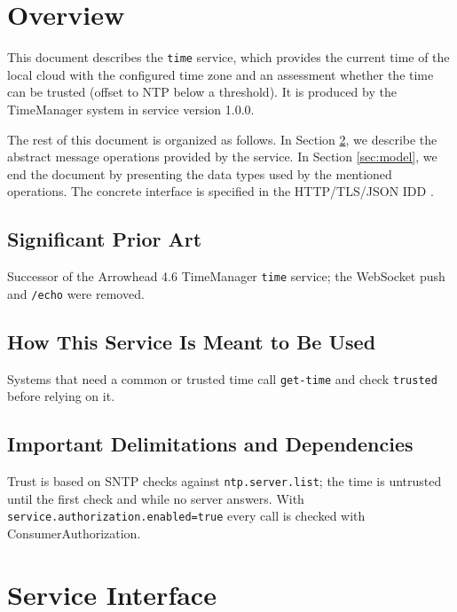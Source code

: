 \documentclass[a4paper]{arrowhead}
\begin{document}
\section{Overview}
\label{sec:overview}

This document describes the \texttt{time} service, which provides the current time of the local cloud with the configured time zone and an assessment whether the time can be trusted (offset to NTP below a threshold).
It is produced by the TimeManager system \cite{tim-sysd} in service version 1.0.0.

The rest of this document is organized as follows.
In Section \ref{sec:operations}, we describe the abstract message operations provided by the service.
In Section \ref{sec:model}, we end the document by presenting the data types used by the mentioned operations.
The concrete interface is specified in the HTTP/TLS/JSON IDD \cite{tim-time-http-idd}.

\subsection{Significant Prior Art}

Successor of the Arrowhead 4.6 TimeManager \texttt{time} service; the WebSocket push and \texttt{/\allowbreak{}echo} were removed.

\subsection{How This Service Is Meant to Be Used}

Systems that need a common or trusted time call \texttt{get-\allowbreak{}time} and check \texttt{trusted} before relying on it.

\subsection{Important Delimitations and Dependencies}
\label{sec:delimitations}

Trust is based on SNTP checks against \texttt{ntp.\allowbreak{}server.\allowbreak{}list}; the time is untrusted until the first check and while no server answers. With \texttt{service.\allowbreak{}authorization.\allowbreak{}enabled=\allowbreak{}true} every call is checked with Consumer\allowbreak{}Authorization.

\newpage

\section{Service Interface}
\label{sec:operations}
\end{document}
